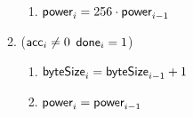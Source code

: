 \begin{enumerate}
\begin{enumerate}
\begin{enumerate}
                    \item $\textsf{power}_{i}=256\cdot \textsf{power}_{i-1}$ 
                \end{enumerate}
            \item \If ($\textsf{acc}_{i} \ne 0$ \Or $\textsf{done}_{i}=1$) \Then 
                \begin{enumerate}
                    \item $\textsf{byteSize}_{i}=\textsf{byteSize}_{i-1} + 1$ 
                    \item $\textsf{power}_{i}=\textsf{power}_{i-1}$
                \end{enumerate}
        \end{enumerate}
\end{enumerate}
